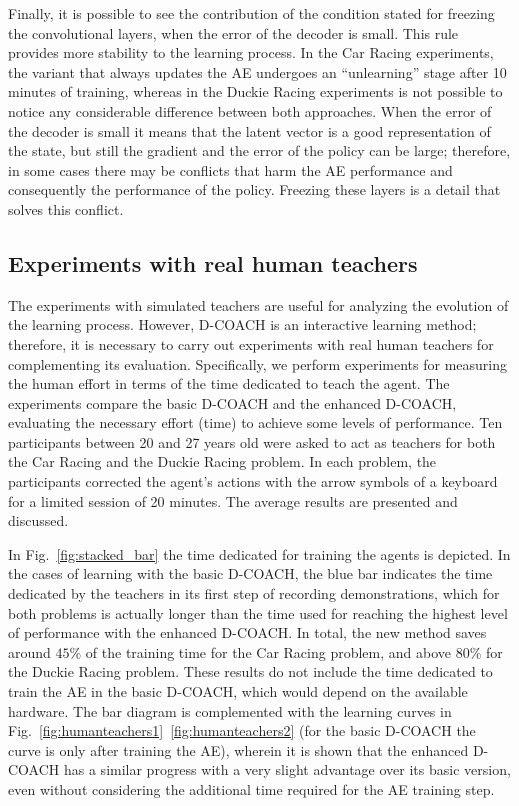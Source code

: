 Finally, it is possible to see the contribution of the condition stated for freezing the convolutional layers, when the error of the decoder is small. This rule provides more stability to the learning process. In the Car Racing experiments, the variant that always updates the AE undergoes an ``unlearning'' stage after 10 minutes of training, whereas in the Duckie Racing experiments is not possible to notice any considerable difference between both approaches. When the error of the decoder is small it means that the latent vector is a good representation of the state, but still the gradient and the error of the policy can be large; therefore, in some cases there may be conflicts that harm the AE performance and consequently the performance of the policy. Freezing these layers is a detail that solves this conflict.

\subsection{Experiments with real human teachers}

The experiments with simulated teachers are useful for analyzing the evolution of the learning process. However, D\nobreakdash-COACH is an interactive learning method; therefore, it is necessary to carry out experiments with real human teachers for complementing its evaluation. Specifically, we perform experiments for measuring the human effort in terms of the time dedicated to teach the agent. The experiments compare the basic D-COACH and the enhanced D-COACH, evaluating the necessary effort (time) to achieve some levels of performance. Ten participants between 20 and 27 years old were asked to act as teachers for both the Car Racing and the Duckie Racing problem. In each problem, the participants corrected the agent's actions with the arrow symbols of a keyboard for a limited session of 20 minutes. 
The average results are presented and discussed.

In Fig.~\ref{fig:stacked_bar} the time dedicated for training the agents is depicted. In the cases of learning with the basic D-COACH, the blue bar indicates the time dedicated by the teachers in its first step of recording demonstrations, which for both problems is actually longer than the time used for reaching the highest level of performance with the enhanced D-COACH. In total, the new method saves around $45\%$ of the training time for the Car Racing problem, and above $80\%$ for the Duckie Racing problem. These results do not include the time dedicated to train the AE in the basic D\nobreakdash-COACH, which would depend on the available hardware. The bar diagram is complemented with the learning curves in Fig.~\ref{fig:humanteachers1}~\ref{fig:humanteachers2} (for the basic D-COACH the curve is only after training the AE), wherein it is shown that the enhanced D-COACH has a similar progress with a very slight advantage over its basic version, even without considering the additional time required for the AE training step.

